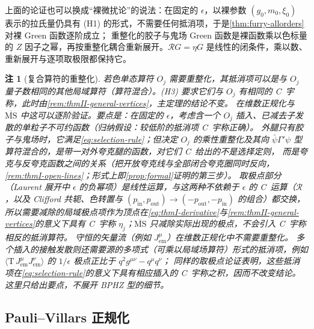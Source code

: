 \documentclass[UTF8,a4paper,11pt,fontset=fandol]{ctexart}
\theoremstyle{cplain}
\theoremstyle{cdefinition}
\theoremstyle{cremark}
\newtheorem{remark}[theorem]{注}
\numberwithin{equation}{section}
\newcommand{\Rop}{\mathcal{R}}                       %
\begin{document}
上面的论证也可以换成“裸微扰论”的说法：在固定的 $\epsilon$，以裸参数 $(g_0,m_0,\xi_0)$ 表示的拉氏量仍具有 (H1) 的形式，不需要任何抵消项，于是\cref{thm:furry-allorders}对裸 Green 函数逐阶成立；
重整化的胶子与鬼场 Green 函数是裸函数乘以色标量的 $Z$ 因子之幂，再按重整化耦合重新展开。$\Rop G=\eta G$ 是线性的闭条件，乘以数、重新展开与逐项取极限都保持它。

\begin{remark}[复合算符的重整化]\label{rem:reg-composite}
若色单态算符 $O_j$ 需要重整化，其抵消项可以是与 $O_j$ 量子数相同的其他局域算符（算符混合）。(H3) 要求它们与 $O_j$ 有相同的 C~宇称，此时由\cref{rem:thmII-general-vertices}，主定理的结论不变。
在维数正规化与 $\overline{\mathrm{MS}}$ 中这可以逐阶验证。要点是：在固定的 $\epsilon$，考虑含一个 $O_j$ 插入、已减去子发散的单粒子不可约函数（归纳假设：较低阶的抵消项 C~宇称正确）。
外腿只有胶子与鬼场时，它满足\cref{eq:selection-rule}；但决定 $O_j$ 的乘性重整化及其向 $\bar\psi\Gamma'\psi$ 型算符混合的，是带一对外夸克腿的函数，对它们 C~给出的不是选择定则，
而是夸克与反夸克函数之间的关系（把开放夸克线与全部闭合夸克圈同时反向，\cref{rem:thmI-open-lines}；形式上即\cref{prop:formal}证明的第三步）。
取极点部分（Laurent 展开中 $\epsilon$ 的负幂项）是线性运算，与这两种不依赖于 $\epsilon$ 的 C~运算（$\Rop$，以及 Clifford 共轭、色转置与 $(p_{\mathrm{in}},p_{\mathrm{out}})\to(-p_{\mathrm{out}},-p_{\mathrm{in}})$ 的组合）都交换，
所以需要减除的局域极点项作为顶点在\cref{eq:thmI-derivative}与\cref{rem:thmII-general-vertices}的意义下具有 C~宇称 $\eta_j$；$\overline{\mathrm{MS}}$ 只减除实际出现的极点，不会引入 C~宇称相反的抵消算符。
守恒的矢量流（例如 $J^\mu_{\mathrm{em}}$）在维数正规化中不需要重整化。
多个插入的接触发散则还需要源的多项式（可乘以局域场算符）形式的抵消项，例如 $\langle\mathrm T\,J^\mu_{\mathrm{em}}J^\nu_{\mathrm{em}}\rangle$ 的 $1/\epsilon$ 极点正比于 $q^2g^{\mu\nu}-q^\mu q^\nu$；
同样的取极点论证表明，这些抵消项在\cref{eq:selection-rule}的意义下具有相应插入的 C~宇称之积，因而不改变结论。这里只给出要点，不展开 BPHZ 型的细节。
\end{remark}

\subsection{Pauli--Villars 正规化}\label{sec:reg-pv}
\end{document}
